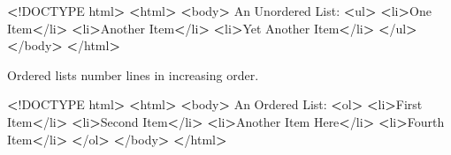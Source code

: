 \documentclass[]{book}
\newenvironment{Shaded}{\begin{snugshade}}{\end{snugshade}}
\newcommand{\ExtensionTok}[1]{#1}
\newcommand{\NormalTok}[1]{#1}
\newcommand{\OperatorTok}[1]{\textcolor[rgb]{0.81,0.36,0.00}{\textbf{#1}}}
\begin{document}
\begin{Shaded}
\begin{Highlighting}[]
\OperatorTok{<}\NormalTok{!}\ExtensionTok{DOCTYPE}\NormalTok{ html}\OperatorTok{>}         
\OperatorTok{<}\ExtensionTok{html}\OperatorTok{>}                  
    \OperatorTok{<}\ExtensionTok{body}\OperatorTok{>}              
        \ExtensionTok{An}\NormalTok{ Unordered List:           }
        \OperatorTok{<}\ExtensionTok{ul}\OperatorTok{>}                         
            \OperatorTok{<}\ExtensionTok{li}\OperatorTok{>}\NormalTok{One Item}\OperatorTok{<}\NormalTok{/li}\OperatorTok{>}        
            \OperatorTok{<}\ExtensionTok{li}\OperatorTok{>}\NormalTok{Another Item}\OperatorTok{<}\NormalTok{/li}\OperatorTok{>}    
            \OperatorTok{<}\ExtensionTok{li}\OperatorTok{>}\NormalTok{Yet Another Item}\OperatorTok{<}\NormalTok{/li}\OperatorTok{>}
        \OperatorTok{<}\NormalTok{/}\ExtensionTok{ul}\OperatorTok{>}                        
    \OperatorTok{<}\NormalTok{/}\ExtensionTok{body}\OperatorTok{>}             
\OperatorTok{<}\NormalTok{/}\ExtensionTok{html}\OperatorTok{>}                 
\end{Highlighting}
\end{Shaded}

Ordered lists number lines in increasing order.

\begin{Shaded}
\begin{Highlighting}[]
\OperatorTok{<}\NormalTok{!}\ExtensionTok{DOCTYPE}\NormalTok{ html}\OperatorTok{>}         
\OperatorTok{<}\ExtensionTok{html}\OperatorTok{>}                  
    \OperatorTok{<}\ExtensionTok{body}\OperatorTok{>}              
        \ExtensionTok{An}\NormalTok{ Ordered List:}
        \OperatorTok{<}\ExtensionTok{ol}\OperatorTok{>}                          
            \OperatorTok{<}\ExtensionTok{li}\OperatorTok{>}\NormalTok{First Item}\OperatorTok{<}\NormalTok{/li}\OperatorTok{>}       
            \OperatorTok{<}\ExtensionTok{li}\OperatorTok{>}\NormalTok{Second Item}\OperatorTok{<}\NormalTok{/li}\OperatorTok{>}      
            \OperatorTok{<}\ExtensionTok{li}\OperatorTok{>}\NormalTok{Another Item Here}\OperatorTok{<}\NormalTok{/li}\OperatorTok{>}
            \OperatorTok{<}\ExtensionTok{li}\OperatorTok{>}\NormalTok{Fourth Item}\OperatorTok{<}\NormalTok{/li}\OperatorTok{>}      
        \OperatorTok{<}\NormalTok{/}\ExtensionTok{ol}\OperatorTok{>}                         
    \OperatorTok{<}\NormalTok{/}\ExtensionTok{body}\OperatorTok{>}             
\OperatorTok{<}\NormalTok{/}\ExtensionTok{html}\OperatorTok{>}                 
\end{Highlighting}
\end{Shaded}
\end{document}
